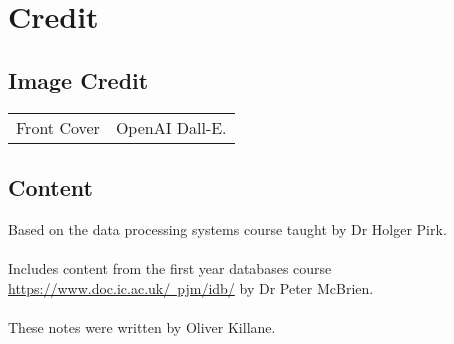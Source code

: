 \chapter{Credit}
\section*{Image Credit}
\begin{center}
	\begin{tabular}{r p{}}
        Front Cover & OpenAI Dall-E. \\
	\end{tabular}
\end{center}

\section*{Content}
Based on the data processing systems course taught by Dr Holger Pirk.
\\
\\ Includes content from the first year databases course \href{40007}{https://www.doc.ic.ac.uk/~pjm/idb/} by Dr Peter McBrien.
\\
\\ These notes were written by Oliver Killane.
